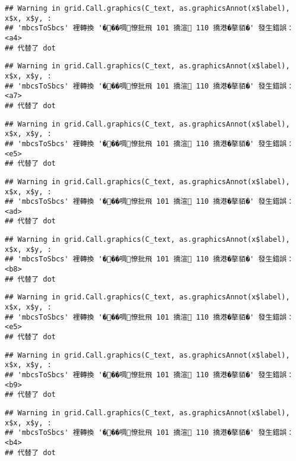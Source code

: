 \documentclass[
]{article}
\begin{document}
\begin{verbatim}
## Warning in grid.Call.graphics(C_text, as.graphicsAnnot(x$label), x$x, x$y, :
## 'mbcsToSbcs' 裡轉換 '���啁憭批飛 101 撟渲 110 撟港�摮貊�' 發生錯誤：<a4>
## 代替了 dot
\end{verbatim}

\begin{verbatim}
## Warning in grid.Call.graphics(C_text, as.graphicsAnnot(x$label), x$x, x$y, :
## 'mbcsToSbcs' 裡轉換 '���啁憭批飛 101 撟渲 110 撟港�摮貊�' 發生錯誤：<a7>
## 代替了 dot
\end{verbatim}

\begin{verbatim}
## Warning in grid.Call.graphics(C_text, as.graphicsAnnot(x$label), x$x, x$y, :
## 'mbcsToSbcs' 裡轉換 '���啁憭批飛 101 撟渲 110 撟港�摮貊�' 發生錯誤：<e5>
## 代替了 dot
\end{verbatim}

\begin{verbatim}
## Warning in grid.Call.graphics(C_text, as.graphicsAnnot(x$label), x$x, x$y, :
## 'mbcsToSbcs' 裡轉換 '���啁憭批飛 101 撟渲 110 撟港�摮貊�' 發生錯誤：<ad>
## 代替了 dot
\end{verbatim}

\begin{verbatim}
## Warning in grid.Call.graphics(C_text, as.graphicsAnnot(x$label), x$x, x$y, :
## 'mbcsToSbcs' 裡轉換 '���啁憭批飛 101 撟渲 110 撟港�摮貊�' 發生錯誤：<b8>
## 代替了 dot
\end{verbatim}

\begin{verbatim}
## Warning in grid.Call.graphics(C_text, as.graphicsAnnot(x$label), x$x, x$y, :
## 'mbcsToSbcs' 裡轉換 '���啁憭批飛 101 撟渲 110 撟港�摮貊�' 發生錯誤：<e5>
## 代替了 dot
\end{verbatim}

\begin{verbatim}
## Warning in grid.Call.graphics(C_text, as.graphicsAnnot(x$label), x$x, x$y, :
## 'mbcsToSbcs' 裡轉換 '���啁憭批飛 101 撟渲 110 撟港�摮貊�' 發生錯誤：<b9>
## 代替了 dot
\end{verbatim}

\begin{verbatim}
## Warning in grid.Call.graphics(C_text, as.graphicsAnnot(x$label), x$x, x$y, :
## 'mbcsToSbcs' 裡轉換 '���啁憭批飛 101 撟渲 110 撟港�摮貊�' 發生錯誤：<b4>
## 代替了 dot
\end{verbatim}
\end{document}
